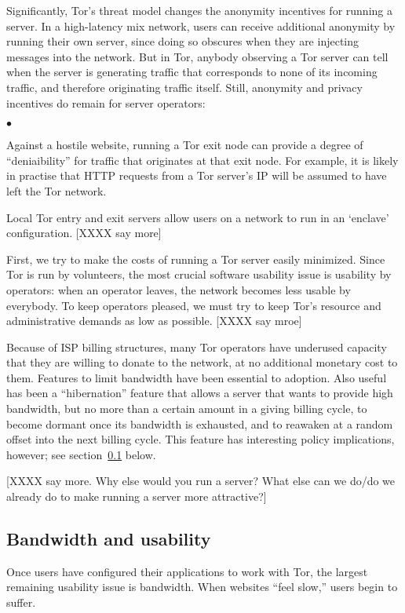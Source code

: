 \documentclass{llncs}
\newenvironment{tightlist}{\begin{list}{$\bullet$}{
  \setlength{\itemsep}{0mm}
    \setlength{\parsep}{0mm}
    }}{\end{list}}
\begin{document}
Significantly, Tor's threat model changes the anonymity incentives for running
a server.  In a high-latency mix network, users can receive additional
anonymity by running their own server, since doing so obscures when they are
injecting messages into the network.  But in Tor, anybody observing a Tor
server can tell when the server is generating traffic that corresponds to
none of its incoming traffic, and therefore originating traffic itself.
Still, anonymity and privacy incentives do remain for server operators:
\begin{tightlist}
\item Against a hostile website, running a Tor exit node can provide a degree
  of ``deniaibility'' for traffic that originates at that exit node.  For
  example, it is likely in practise that HTTP requests from a Tor server's IP
  will be assumed to have left the Tor network.
\item Local Tor entry and exit servers allow users on a network to run in an
  `enclave' configuration.  [XXXX say more]
\end{tightlist}

First, we try to make the costs of running a Tor server easily minimized.
Since Tor is run by volunteers, the most crucial software usability issue is
usability by operators: when an operator leaves, the network becomes less
usable by everybody.  To keep operators pleased, we must try to keep Tor's
resource and administrative demands as low as possible. [XXXX say mroe]

Because of ISP billing structures, many Tor operators have underused capacity
that they are willing to donate to the network, at no additional monetary
cost to them.  Features to limit bandwidth have been essential to adoption.
Also useful has been a ``hibernation'' feature that allows a server that
wants to provide high bandwidth, but no more than a certain amount in a
giving billing cycle, to become dormant once its bandwidth is exhausted, and
to reawaken at a random offset into the next billing cycle.  This feature has
interesting policy implications, however; see
section~\ref{subsec:bandwidth-and-usability} below.

[XXXX say more.  Why else would you run a server? What else can we do/do we
  already do to make running a server more attractive?]

\subsection{Bandwidth and usability}
\label{subsec:bandwidth-and-usability}
Once users have configured their applications to work with Tor, the largest
remaining usability issue is bandwidth.  When websites ``feel slow,'' users
begin to suffer.
\end{document}
